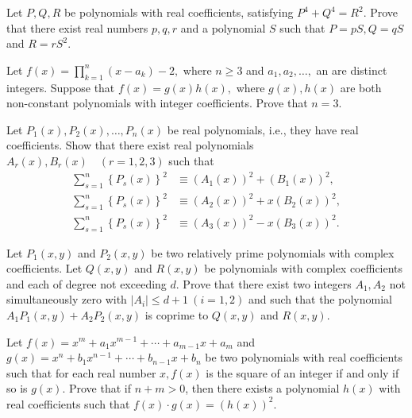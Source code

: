 \begin{question}[name={1987 IMO Longlist}]
    Let $P,Q,R$ be polynomials with real coefficients, satisfying $P^4+Q^4 = R^2$. Prove that there exist real numbers $p, q, r$ and a polynomial $S$ such that $P = pS, Q = qS$ and $R = rS^2$.
\end{question}


\begin{question}[name={1989 IMO Longlist}]
    Let $f(x) = \prod^n_{k=1} (x - a_k) - 2,$ where $ n \geq 3$ and $a_1, a_2, \dots,$ an are distinct integers. Suppose that $f(x) = g(x)h(x),$ where $ g(x), h(x)$ are both non-constant polynomials with integer coefficients. Prove that $n = 3.$
\end{question}


\begin{question}[name={1989 IMO Longlist}]
    Let $ P_1(x), P_2(x), \dots, P_n(x)$ be real polynomials, i.e., they have real coefficients. Show that there exist real polynomials $A_r(x),B_r(x) \quad (r = 1, 2, 3)$ such that
    \begin{align*}
        \sum^n_{s=1} \left\{ P_s(x) \right \}^2 &\equiv \left( A_1(x) \right)^2 + \left( B_1(x) \right)^2,\\
        \sum^n_{s=1} \left\{ P_s(x) \right \}^2 &\equiv \left( A_2(x) \right)^2 + x \left( B_2(x) \right)^2,\\
        \sum^n_{s=1} \left\{ P_s(x) \right \}^2 &\equiv \left( A_3(x) \right)^2 - x \left( B_3(x) \right)^2.
    \end{align*}
\end{question}

\begin{question}[name={1992 IMO Longlist}]
    Let $P_1(x, y)$ and $P_2(x, y)$ be two relatively prime polynomials with complex coefficients. Let $Q(x, y)$ and $R(x, y)$ be polynomials with complex coefficients and each of degree not exceeding $d$. Prove that there exist two integers $A_1, A_2$ not simultaneously zero with $|A_i| \leq d + 1 \  (i = 1, 2)$ and such that the polynomial $A_1P_1(x, y) + A_2P_2(x, y)$ is coprime to $Q(x, y)$ and $R(x, y).$
\end{question}

\begin{question}[name={1992 IMO Longlist}]
    Let $f(x) = x^m + a_1x^{m-1} + \cdots+ a_{m-1}x + a_m$ and $g(x) = x^n + b_1x^{n-1} + \cdots + b_{n-1}x + b_n$ be two polynomials with real coefficients such that for each real number $x, f(x)$ is the square of an integer if and only if so is $g(x)$. Prove that if $n +m > 0$, then there exists a polynomial $h(x)$ with real coefficients such that $f(x) \cdot g(x) = (h(x))^2.$
\end{question}


